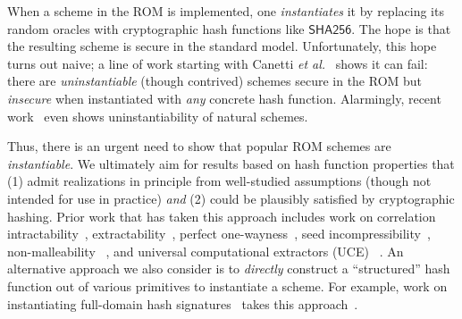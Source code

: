  When a scheme in the ROM is implemented, one \emph{instantiates} it by replacing  its random oracles with  cryptographic hash functions like $\mathsf{SHA256}$. The hope is that the resulting scheme is secure in the standard model.  Unfortunately, this hope turns out  naive;
 a line of work starting with Canetti \emph{et al.}~\cite{JACM:CanGolHal04} shows it can fail: there are \emph{uninstantiable} (though contrived) schemes secure in the ROM but \emph{insecure} when instantiated with \emph{any} concrete hash function.  %
Alarmingly, recent work~\cite{C:FieLan25,KRS25} even shows uninstantiability of  natural schemes.

Thus, there is an urgent need to show that popular ROM schemes are 
\emph{instantiable}. We ultimately aim for results based on hash function 
properties that (1) admit realizations in principle from well-studied 
assumptions (though not intended for use in practice) \emph{and} (2) could be plausibly
satisfied by cryptographic hashing. Prior work that has taken this approach includes work on correlation intractability~\cite{JACM:CanGolHal04,
TCC:CanCheRey16,EC:CCRR18,STOC:CCHLRRW19}, extractability~\cite{ICALP:CanDak08,
TCC:CanDak09,ITCS:BCCT12}, perfect one-wayness~\cite{C:Canetti97,STOC:CanMicRei98,
EC:Fischlin99}, seed incompressibility~\cite{TCC:HalMyeRac08}, non-malleability~
\cite{AC:BCFW09,RSA:BaeFisSch11}, and universal computational extractors (UCE)~
\cite{C:BelHoaKee13,C:BrzFarMit14,C:BelHoaKee14}. An alternative approach we also consider is to 
\emph{directly} construct a ``structured'' hash function out of various primitives to instantiate a  
scheme. For example, work on instantiating full-domain hash signatures~\cite{CCS:BelRog93} takes this approach~\cite{EC:HohSahWat14,AC:BoyPas15,C:Zhandry16}.

